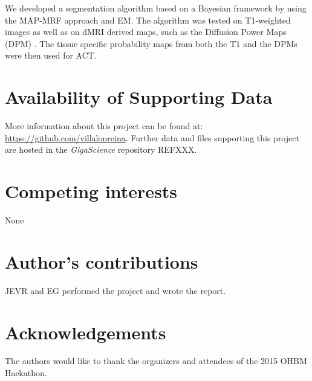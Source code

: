 \documentclass[twocolumn]{bmcart}%
\begin{document}
We developed a segmentation algorithm based on a Bayesian framework by
using the MAP-MRF approach and EM. The algorithm was tested on
T1-weighted images as well as on dMRI derived maps, such as the
Diffusion Power Maps (DPM) \cite{Dell2014}. The tissue specific
probability maps from both the T1 and the DPMs were then used for ACT.


\begin{backmatter}

\section*{Availability of Supporting Data}
More information about this project can be found at: \url{https://github.com/villalonreina}. Further data and files supporting this project are hosted in the \emph{GigaScience} repository REFXXX.

\section*{Competing interests}
None

\section*{Author's contributions}
JEVR and EG performed the project and wrote the report.

\section*{Acknowledgements}
The authors would like to thank the organizers and attendees of the 2015
OHBM Hackathon.

  
  


\end{backmatter}
\end{document}
